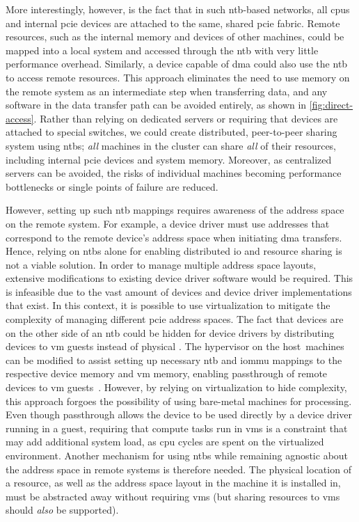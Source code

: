 More interestingly, however, is the fact that in such \gls{ntb}-based networks, all \glspl{cpu} and internal \gls{pcie} devices are attached to the same, shared \gls{pcie} fabric.
%
Remote resources, such as the internal memory and devices of other machines, could be mapped into a local system and accessed through the \gls{ntb} with very little performance overhead.
%
Similarly, a device capable of \gls{dma} could also use the \gls{ntb} to access remote resources.
%
This approach eliminates the need to use memory on the remote system as an intermediate step when transferring data, and any software in the data transfer path can be avoided entirely, as shown in \cref{fig:direct-access}.
%
Rather than relying on dedicated servers or requiring that devices are attached to special switches, we could create distributed, peer-to-peer sharing system using \glspl{ntb};
%
\emph{all} machines in the cluster can share \emph{all} of their resources, including internal \gls{pcie} devices and system memory. 
%
Moreover, as centralized servers can be avoided, the risks of individual machines becoming performance bottlenecks or single points of failure are reduced.



However, setting up such \gls{ntb} mappings requires awareness of the address space on the remote system.
%
For example, a device driver must use addresses that correspond to the remote device's address space when initiating \gls{dma} transfers.
%
Hence, relying on \glspl{ntb} alone for enabling distributed \gls{io} and resource sharing is not a viable solution.
%
In order to manage multiple address space layouts, extensive modifications to existing device driver software would be required.
%
This is infeasible due to the vast amount of devices and device driver implementations that exist.
%
In this context, it is possible to use virtualization to mitigate the complexity of managing different \gls{pcie} address spaces.
%
The fact that devices are on the other side of an \gls{ntb} could be hidden for device drivers by distributing devices to \gls{vm} \glspl{guest} instead of physical .
%
The \gls{hypervisor} on the host~machines can be modified to assist setting up necessary \gls{ntb} and \gls{iommu} mappings to the respective device memory and \gls{vm} memory, enabling \gls{passthrough} of remote devices to \gls{vm} \glspl{guest}~\cite{Tu2013}.
%
However, by relying on virtualization to hide complexity, this approach forgoes the possibility of using bare-metal machines for processing.
%
Even though \gls{passthrough} allows the device to be used directly by a device driver running in a \gls{guest}, requiring that compute tasks run in \glspl{vm} is a constraint that may add additional system load, as \gls{cpu} cycles are spent on  the virtualized environment.
%
Another mechanism for using \glspl{ntb} while remaining agnostic about the address space in remote systems is therefore needed.
%
The physical location of a resource, as well as the address space layout in the machine it is installed in, must be abstracted away without requiring \glspl{vm} (but sharing resources to \glspl{vm} should \emph{also} be supported).



